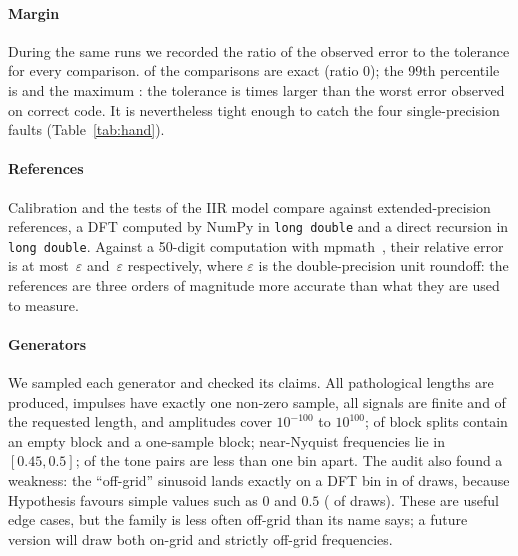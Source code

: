 \documentclass[10pt,conference]{IEEEtran}
\newcommand{\eps}{\varepsilon}
\newcommand{\code}[1]{\texttt{#1}}
\begin{document}
\paragraph*{Margin} During the same runs we recorded the ratio of the observed
error to the tolerance for every comparison. \marginExact{} of the comparisons
are exact (ratio 0); the 99th percentile is \marginPnn{} and the maximum
\marginMax: the tolerance is \marginFactor{} times larger than the worst error
observed on correct code. It is nevertheless tight enough to catch the four
single-precision faults (Table~\ref{tab:hand}).

\paragraph*{References} Calibration and the tests of the IIR model compare
against extended-precision references, a DFT computed by NumPy in
\code{long double} and a direct recursion in \code{long double}. Against
a 50-digit computation with mpmath~\cite{mpmath}, their relative error is at most
$\,\eps$ and $\,\eps$ respectively, where $\eps$ is
the double-precision unit roundoff: the references are three orders of
magnitude more accurate than what they are used to measure.

\paragraph*{Generators} We sampled each generator and checked its claims.
All \genPathoCount{} pathological lengths are produced, impulses have
exactly one non-zero sample, all signals are finite and of the requested
length, and amplitudes cover $10^{-100}$ to $10^{100}$; \genEmptyBlock{} of
block splits contain an empty block and \genOneBlock{} a one-sample block;
near-Nyquist frequencies lie in $[0.45,0.5]$; \genCloseBelowOne{} of the tone
pairs are less than one bin apart. The audit also found a weakness: the
``off-grid'' sinusoid lands exactly on a DFT bin in \genOnGrid{} of draws,
because Hypothesis favours simple values such as 0 and $0.5$ (\genZeroNyq{} of
draws). These are useful edge cases, but the family is less often off-grid than
its name says; a future version will draw both on-grid and strictly off-grid
frequencies.
\end{document}

